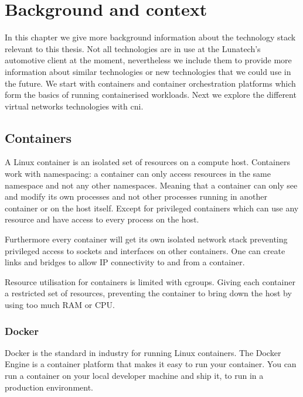 \chapter{Background and context}
\label{chap:background}

In this chapter we give more background information about the technology stack relevant to this thesis. Not all technologies are in use at the Lunatech's automotive client at the moment, nevertheless we include them to provide more information about similar technologies or new technologies that we could use in the future. We start with containers and container orchestration platforms which form the basics of running containerised workloads. Next we explore the different virtual networks technologies with \gls{cni}.

\section{Containers}
\label{sec:containers}
A Linux container is an isolated set of resources on a compute host. Containers work with namespacing: a container can only access resources in the same namespace and not any other namespaces. Meaning that a container can only see and modify its own processes and not other processes running in another container or on the host itself. Except for privileged containers which can use any resource and have access to every process on the host. 

Furthermore every container will get its own isolated network stack preventing privileged access to sockets and interfaces on other containers. One can create links and bridges to allow IP connectivity to and from a container.

Resource utilisation for containers is limited with \glspl{cgroup}. Giving each container a restricted set of resources, preventing the container to bring down the host by using too much RAM or CPU\cite{docker_security}.

\subsection{Docker}
\label{subsec:docker}
Docker is the standard in industry for running Linux containers. The Docker Engine is a container platform that makes it easy to run your container. You can run a container on your local developer machine and ship it, to run in a production environment.


